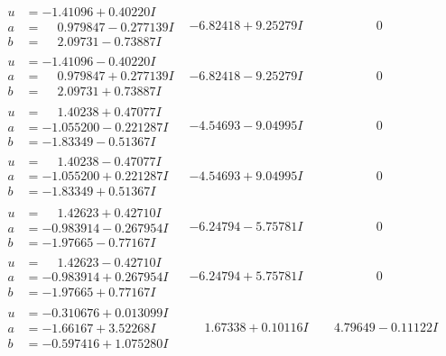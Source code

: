 \documentclass[1p]{elsarticle_modified}
\theoremstyle{definition}
\begin{document}
$$\begin{array}{c|c|c}
\begin{aligned}
u &= -1.41096 + 0.40220 I \\
a &= \phantom{-}0.979847 - 0.277139 I \\
b &= \phantom{-}2.09731 - 0.73887 I\end{aligned}
 & -6.82418 + 9.25279 I & \phantom{-0.000000 } 0 \\ \hline\begin{aligned}
u &= -1.41096 - 0.40220 I \\
a &= \phantom{-}0.979847 + 0.277139 I \\
b &= \phantom{-}2.09731 + 0.73887 I\end{aligned}
 & -6.82418 - 9.25279 I & \phantom{-0.000000 } 0 \\ \hline\begin{aligned}
u &= \phantom{-}1.40238 + 0.47077 I \\
a &= -1.055200 - 0.221287 I \\
b &= -1.83349 - 0.51367 I\end{aligned}
 & -4.54693 - 9.04995 I & \phantom{-0.000000 } 0 \\ \hline\begin{aligned}
u &= \phantom{-}1.40238 - 0.47077 I \\
a &= -1.055200 + 0.221287 I \\
b &= -1.83349 + 0.51367 I\end{aligned}
 & -4.54693 + 9.04995 I & \phantom{-0.000000 } 0 \\ \hline\begin{aligned}
u &= \phantom{-}1.42623 + 0.42710 I \\
a &= -0.983914 - 0.267954 I \\
b &= -1.97665 - 0.77167 I\end{aligned}
 & -6.24794 - 5.75781 I & \phantom{-0.000000 } 0 \\ \hline\begin{aligned}
u &= \phantom{-}1.42623 - 0.42710 I \\
a &= -0.983914 + 0.267954 I \\
b &= -1.97665 + 0.77167 I\end{aligned}
 & -6.24794 + 5.75781 I & \phantom{-0.000000 } 0 \\ \hline\begin{aligned}
u &= -0.310676 + 0.013099 I \\
a &= -1.66167 + 3.52268 I \\
b &= -0.597416 + 1.075280 I\end{aligned}
 & \phantom{-}1.67338 + 0.10116 I & \phantom{-}4.79649 - 0.11122 I \\ \hline\begin{aligned}

\end{aligned}
\end{array}$$
\end{document}
